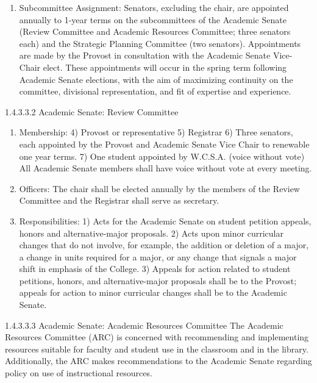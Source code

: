 \documentclass[letterpaper, 11pt]{article}
\begin{document}
\begin{enumerate}[label=\alph*)]
					\item{Subcommittee Assignment:  Senators, excluding the chair, are appointed annually to 1-year terms on the subcommittees of the Academic Senate (Review Committee and Academic Resources Committee; three senators each) and the Strategic Planning Committee (two senators).  Appointments are made by the Provost in consultation with the Academic Senate Vice-Chair elect.  These appointments will occur in the spring term following Academic Senate elections, with the aim of maximizing continuity on the committee, divisional representation, and fit of expertise and experience.}
				\end{enumerate}
				1.4.3.3.2 Academic Senate:  Review Committee
				\begin{enumerate}[label=\alph*)]
					\item{Membership:}
					4) Provost or representative
					5) Registrar
					6) Three senators, each appointed by the Provost and Academic Senate Vice Chair to renewable one year terms.
					7) One student appointed by W.C.S.A. (voice without vote)
					All Academic Senate members shall have voice without vote at every meeting.
					\item{Officers:}
					The chair shall be elected annually by the members of the Review Committee and the Registrar shall serve as secretary.
					\item{Responsibilities:}
					1) Acts for the Academic Senate on student petition appeals, honors and alternative-major proposals.
					2) Acts upon minor curricular changes that do not involve, for example, the addition or deletion of a major, a change in units required for a major, or any change that signals a major shift in emphasis of the College.
					3) Appeals for action related to student petitions, honors, and alternative-major proposals shall be to the Provost; appeals for action to minor curricular changes shall be to the Academic Senate.
				\end{enumerate}
				1.4.3.3.3 Academic Senate:  Academic Resources Committee
				The Academic Resources Committee (ARC) is concerned with recommending and implementing resources suitable for faculty and student use in the classroom and in the library.  Additionally, the ARC makes recommendations to the Academic Senate regarding policy on use of instructional resources.
\end{document}
